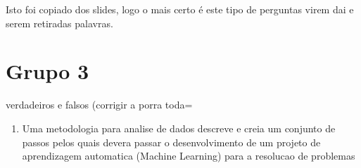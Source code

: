 \documentclass[11pt]{article}
\begin{document}
Isto foi copiado dos slides, logo o mais certo é este tipo de perguntas virem dai e serem retiradas palavras.

\section{Grupo 3}
\label{sec:org90b12f4}
verdadeiros e falsos (corrigir a porra toda=

\begin{enumerate}
\item Uma metodologia para analise de dados descreve e creia um conjunto de passos pelos quais devera passar o desenvolvimento de um projeto de aprendizagem automatica (Machine Learning) para a resolucao de problemas
\end{enumerate}
\end{document}
